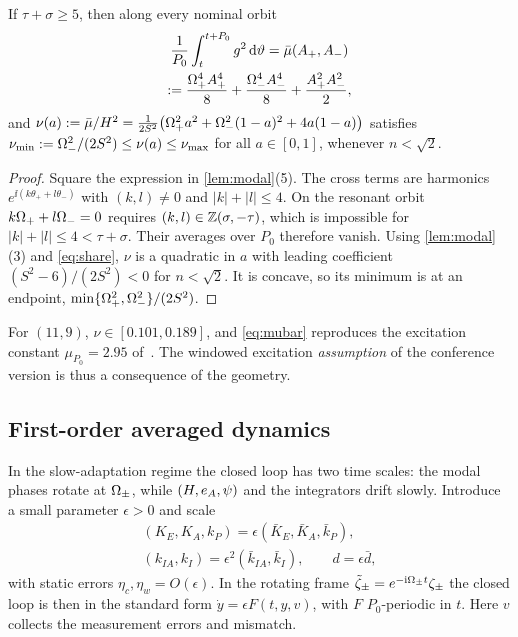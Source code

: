 \begin{lemma}\label{lem:pe}
If $\tau+\sigma\ge5$, then along every nominal orbit
\begin{multline}\label{eq:mubar}
  \frac{1}{P_0}\int_t^{t+P_0}g^2\,\mathrm{d}\vartheta=\bar\mu(A_+,A_-)\\
  :=\frac{\Omega_+^4A_+^4}{8}+\frac{\Omega_-^4A_-^4}{8}+\frac{A_+^2A_-^2}{2},
\end{multline}
and $\nu(a):=\bar\mu/H^2=\tfrac{1}{2S^2}\big(\Omega_+^2a^2+\Omega_-^2(1-a)^2+4a(1-a)\big)$
satisfies $\nu_{\min}:=\Omega_-^2/(2S^2)\le\nu(a)\le\nu_{\max}$ for all $a\in[0,1]$,
whenever $n<\sqrt2$.
\end{lemma}
\begin{proof}
Square the expression in \cref{lem:modal}(5).
The cross terms are harmonics $e^{\ii(k\theta_++l\theta_-)}$ with
$(k,l)\neq0$ and $|k|+|l|\le4$.
On the resonant orbit $k\Omega_++l\Omega_-=0$ requires $(k,l)\in\mathbb{Z}(\sigma,-\tau)$, which
is impossible for $|k|+|l|\le4<\tau+\sigma$.
Their averages over $P_0$ therefore vanish.
Using \cref{lem:modal}(3) and \eqref{eq:share}, $\nu$ is a quadratic in $a$ with
leading coefficient $(S^2-6)/(2S^2)<0$ for $n<\sqrt2$.
It is concave, so its minimum is at an endpoint, $\min\{\Omega_+^2,\Omega_-^2\}/(2S^2)$.
\end{proof}

For $(11,9)$, $\nu\in[0.101,0.189]$, and \eqref{eq:mubar} reproduces the
excitation constant $\mu_{P_0}=2.95$ of~\citet{juchem2027restoring}.
The windowed excitation \emph{assumption} of the conference version is thus a
consequence of the geometry.

\subsection{First-order averaged dynamics}
In the slow-adaptation regime the closed loop has two time scales: the modal
phases rotate at $\Omega_\pm$, while $(H,e_A,\psi)$ and the integrators drift slowly.
Introduce a small parameter $\epsilon>0$ and scale
\begin{equation}\label{eq:scaling}
\begin{gathered}
  (K_E,K_A,k_P)=\epsilon(\bar K_E,\bar K_A,\bar k_P),\\
  (k_{IA},k_I)=\epsilon^2(\bar k_{IA},\bar k_I),\qquad d=\epsilon\bar d,
\end{gathered}
\end{equation}
with static errors $\eta_c,\eta_w=O(\epsilon)$.
In the rotating frame $\tilde\zeta_\pm=e^{-\mathrm{i}\Omega_\pm t}\zeta_\pm$ the closed loop is
then in the standard form $\dot y=\epsilon F(t,y,v)$, with $F$ $P_0$-periodic in
$t$.
Here $v$ collects the measurement errors and mismatch.

